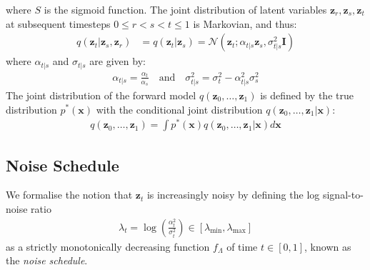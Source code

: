 \documentclass[ oneside,%
                    author={George Herbert},
                    degree={MSci},
                     title={Diffusion Models for Time-Evolving Precipitation Fields},
                  subtitle={}]{dissertation}
\begin{document}
where $S$ is the sigmoid function. The joint distribution of latent variables $\mathbf{z}_r,\mathbf{z}_s,\mathbf{z}_t$ at subsequent timesteps $0\le r < s < t \le 1$ is Markovian, and thus:
\begin{align}
      q(\mathbf{z}_t|\mathbf{z}_s,\mathbf{z}_r)&=q(\mathbf{z}_t|\mathbf{z}_s)=\mathcal{N}\left(\mathbf{z}_t; \alpha_{t|s}\mathbf{z}_s, \sigma_{t|s}^2\mathbf{I}\right)
\end{align}
where $\alpha_{t|s}$ and $\sigma_{t|s}$ are given by:
\begin{align}
      \alpha_{t|s} = \frac{\alpha_t}{\alpha_s}\quad\mathrm{and}\quad \sigma_{t|s}^2 = \sigma_t^2-\alpha_{t|s}^2\sigma_s^2
\end{align}
The joint distribution of the forward model $q(\mathbf{z}_0,\ldots,\mathbf{z}_1)$ is defined by the true distribution $p^*(\mathbf{x})$ with the conditional joint distribution $q(\mathbf{z}_0,\ldots,\mathbf{z}_1|\mathbf{x})$:
\begin{align}
      q(\mathbf{z}_0,\ldots,\mathbf{z}_1)=\int p^*(\mathbf{x}) q(\mathbf{z}_0,\ldots,\mathbf{z}_1|\mathbf{x}) d\mathbf{x}
\end{align}

\subsection{Noise Schedule}
\label{sec:background_diffusion_noise_schedule}

We formalise the notion that $\mathbf{z}_t$ is increasingly noisy by defining the log signal-to-noise ratio
\begin{align}
      \lambda_t = \log\left( \frac{\alpha_t^2}{\sigma_t^2}\right)\in[\lambda_{\min}, \lambda_{\max}]
\end{align}
as a strictly monotonically decreasing function $f_{\Lambda}$ of time $t\in[0, 1]$, known as the \textit{noise schedule}.
\end{document}
